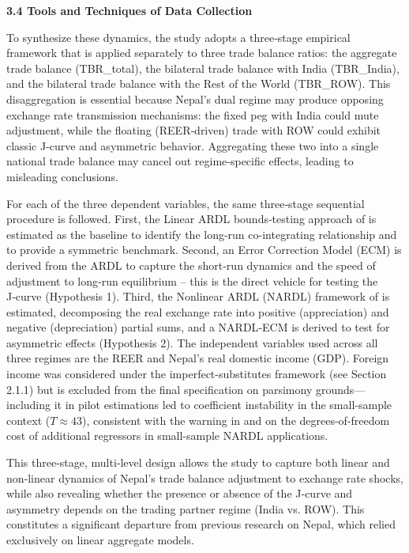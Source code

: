\documentclass[12pt]{article}
\begin{document}
\vspace{0.5cm}
\noindent\textbf{3.4 Tools and Techniques of Data Collection}

To synthesize these dynamics, the study adopts a three‑stage empirical framework that is applied separately to three trade balance ratios: the aggregate trade balance (TBR\_total), the bilateral trade balance with India (TBR\_India), and the bilateral trade balance with the Rest of the World (TBR\_ROW). This disaggregation is essential because Nepal's dual regime may produce opposing exchange rate transmission mechanisms: the fixed peg with India could mute adjustment, while the floating (REER‑driven) trade with ROW could exhibit classic J‑curve and asymmetric behavior. Aggregating these two into a single national trade balance may cancel out regime‑specific effects, leading to misleading conclusions.

For each of the three dependent variables, the same three‑stage sequential procedure is followed. First, the Linear ARDL bounds‑testing approach of \textcite{Pesaran2001-kt} is estimated as the baseline to identify the long‑run co-integrating relationship and to provide a symmetric benchmark. Second, an Error Correction Model (ECM) is derived from the ARDL to capture the short‑run dynamics and the speed of adjustment to long‑run equilibrium – this is the direct vehicle for testing the J‑curve (Hypothesis 1). Third, the Nonlinear ARDL (NARDL) framework of \textcite{Shin2014-ap} is estimated, decomposing the real exchange rate into positive (appreciation) and negative (depreciation) partial sums, and a NARDL‑ECM is derived to test for asymmetric effects (Hypothesis 2). The independent variables used across all three regimes are the REER and Nepal's real domestic income (GDP). Foreign income was considered under the imperfect-substitutes framework (see Section 2.1.1) but is excluded from the final specification on parsimony grounds---including it in pilot estimations led to coefficient instability in the small-sample context ($T \approx 43$), consistent with the warning in \textcite{Abegaz2024-wp} and \textcite{Pertiwi2024-me} on the degrees-of-freedom cost of additional regressors in small-sample NARDL applications. 

This three‑stage, multi‑level design allows the study to capture both linear and non‑linear dynamics of Nepal’s trade balance adjustment to exchange rate shocks, while also revealing whether the presence or absence of the J‑curve and asymmetry depends on the trading partner regime (India vs. ROW). This constitutes a significant departure from previous research on Nepal, which relied exclusively on linear aggregate models.
\end{document}
